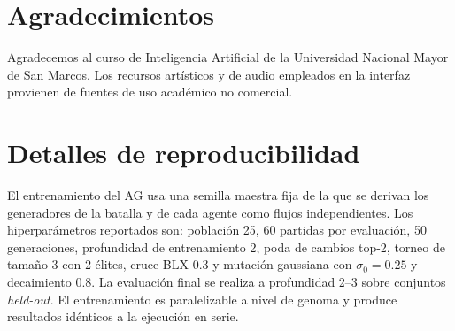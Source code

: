 \documentclass[11pt]{article}
\begin{document}
\section*{Agradecimientos}

Agradecemos al curso de Inteligencia Artificial de la Universidad Nacional Mayor
de San Marcos. Los recursos artísticos y de audio empleados en la interfaz
provienen de fuentes de uso académico no comercial.



\appendix

\section{Detalles de reproducibilidad}
\label{sec:appendix}

El entrenamiento del AG usa una semilla maestra fija de la que se derivan los
generadores de la batalla y de cada agente como flujos independientes. Los
hiperparámetros reportados son: población 25, 60 partidas por evaluación, 50
generaciones, profundidad de entrenamiento 2, poda de cambios top-2, torneo de
tamaño 3 con 2 élites, cruce BLX-0.3 y mutación gaussiana con $\sigma_0{=}0.25$ y
decaimiento 0.8. La evaluación final se realiza a profundidad 2--3 sobre
conjuntos \emph{held-out}. El entrenamiento es paralelizable a nivel de genoma y
produce resultados idénticos a la ejecución en serie.
\end{document}
